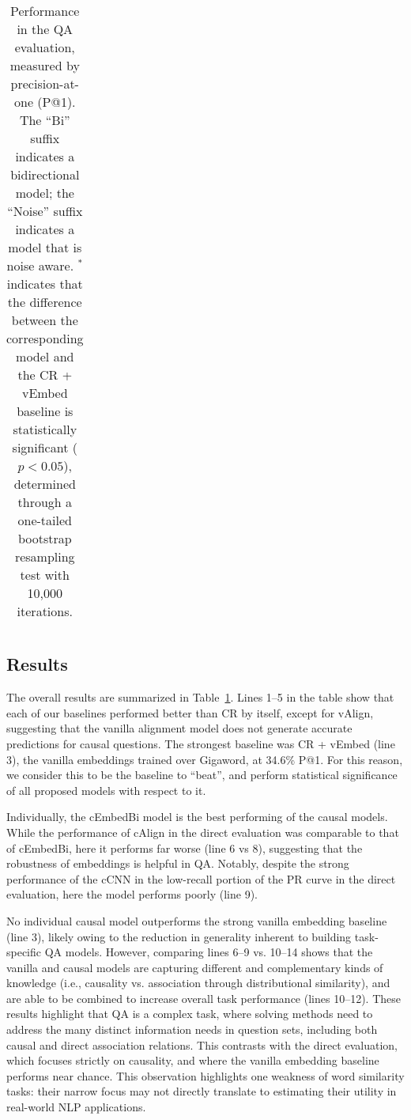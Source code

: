 \begin{table}[t!]
\begin{center}
\begin{footnotesize}
\begin{tabular}{lll}
\end{tabular}
\end{footnotesize}
\vspace{-1mm}
\caption{{\footnotesize Performance in the QA evaluation, measured by precision-at-one (P@1).  The ``Bi'' suffix indicates a bidirectional model; the ``Noise'' suffix indicates a model that is noise aware. $^*$  indicates that the difference between the corresponding model and the CR + vEmbed baseline is statistically significant ($p < 0.05$), %
determined through a one-tailed bootstrap resampling test with 10,000 iterations. }} 
\label{tab:QA}
\vspace{-8mm}
\end{center}
\end{table}

\subsection{Results}
The overall results are summarized in Table~\ref{tab:QA}.
Lines 1--5 in the table show that each of our baselines performed better than CR by itself, except for vAlign, suggesting that the vanilla alignment model does not generate accurate predictions for causal questions.
The strongest baseline was CR + vEmbed (line 3), the vanilla embeddings trained over Gigaword, at 34.6\% P@1. For this reason, we consider this to be the baseline to ``beat'', and perform statistical significance of all proposed models with respect to it. 

Individually, the cEmbedBi model is the best performing of the causal models.  While the performance of cAlign in the direct evaluation was comparable to that of cEmbedBi, here it performs far worse (line 6 vs 8), suggesting that the robustness of embeddings is helpful in QA.  Notably, despite the strong performance of the cCNN in the low-recall portion of the PR curve in the direct evaluation, here the model performs poorly (line 9).

No individual causal model outperforms the strong vanilla embedding baseline (line 3), likely owing to the reduction in generality inherent to building task-specific QA models.
However, comparing lines 6--9 vs. 10--14 shows that the vanilla and causal models are capturing different and complementary kinds of knowledge (i.e., causality vs. association through distributional similarity), and are able to be combined to increase overall task performance (lines 10--12).  These results highlight that QA is a complex task, where solving methods need to address the many distinct information needs in question sets, including both causal and direct association relations.  This contrasts with the direct evaluation, which focuses strictly on causality, and where the vanilla embedding baseline performs near chance. This observation highlights one weakness of word similarity tasks: their narrow focus may not directly translate to estimating their utility in real-world NLP applications. %

